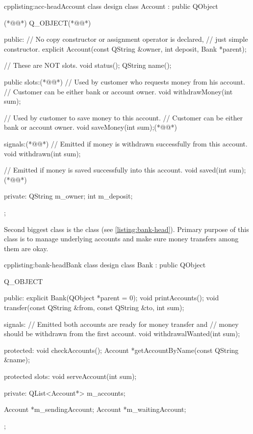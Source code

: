 \begin{fdoccode}{cpp}{listing:acc-head}{Account class design}
class Account : public QObject {(*@\label{listing:qobj1}@*)
	Q_OBJECT(*@\label{listing:qobj2}@*)

    public:
		// No copy constructor or assignment operator is declared,
		// just simple constructor.
		explicit Account(const QString &owner,
						int deposit,
						Bank *parent);

		// These are NOT slots.
		void status();
		QString name();

    public slots:(*@\label{listing:slots1}@*)
		// Used by customer who requests money from his account.
		// Customer can be either bank or account owner.
		void withdrawMoney(int sum);

		// Used by customer to save money to this account.
		// Customer can be either bank or account owner.
		void saveMoney(int sum);(*@\label{listing:slots2}@*)

    signals:(*@\label{listing:signals1}@*)
		// Emitted if money is withdrawn successfully from this account.
		void withdrawn(int sum);

		// Emitted if money is saved successfully into this account.
		void saved(int sum);(*@\label{listing:signals2}@*)

    private:
		QString m_owner;
		int m_deposit;
};
\end{fdoccode}

Second biggest class is the class (see \autoref{listing:bank-head}). Primary purpose of this class is to manage underlying accounts and make sure money transfers among them are okay.

\begin{fdoccode}{cpp}{listing:bank-head}{Bank class design}
class Bank : public QObject {
	Q_OBJECT

    public:
		explicit Bank(QObject *parent = 0);
		void printAccounts();
		void transfer(const QString &from, const QString &to, int sum);

    signals:
		// Emitted both accounts are ready for money transfer and
		// money should be withdrawn from the first account.
		void withdrawalWanted(int sum);

    protected:
		void checkAccounts();
		Account *getAccountByName(const QString &name);

    protected slots:
		void serveAccount(int sum);

	private:
		QList<Account*> m_accounts;

		Account *m_sendingAccount;
		Account *m_waitingAccount;
};
\end{fdoccode}

